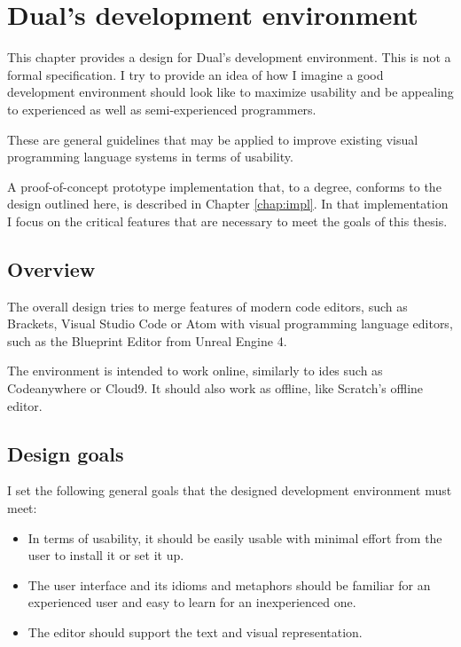 \chapter{Dual's development environment}\label{chap:editor}
This chapter provides a design for Dual's development environment. This is not a formal specification. I try to provide an idea of how I imagine a good development environment should look like to maximize usability and be appealing to experienced as well as semi-experienced programmers.

These are general guidelines that may be applied to improve existing visual programming language systems in terms of usability.

A proof-of-concept prototype implementation that, to a degree, conforms to the design outlined here, is described in Chapter \ref{chap:impl}. In that implementation I focus on the critical features that are necessary to meet the goals of this thesis.

\section{Overview}
The overall design tries to merge features of modern code editors, such as Brackets\cite{brackets_site}, Visual Studio Code\cite{vscode_site} or Atom\cite{atom_site} with visual programming language editors, such as the Blueprint Editor from Unreal Engine 4\cite{blueprint_editor}.

The environment is intended to work online, similarly to \acrlong{ide}s such as Codeanywhere\cite{codeanywhere_website} or Cloud9\cite{c9_website}. It should also work as offline, like Scratch's offline editor\cite{scratch_offline}.

\section{Design goals}
I set the following general goals that the designed development environment must meet:
\begin{itemize}
\item In terms of usability, it should be easily usable with minimal effort from the user to install it or set it up.
\item The user interface and its idioms and metaphors\cite{ui_idioms} should be familiar for an experienced user and easy to learn for an inexperienced one.
\item The editor should support the text and visual representation.
\end{itemize}

